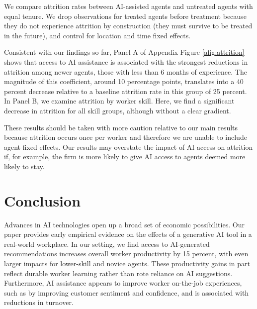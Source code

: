 \documentclass[11pt]{article}
\begin{document}
We compare attrition rates between AI-assisted agents and untreated agents with equal tenure. We drop observations for treated agents before treatment because they do not experience attrition by construction (they must survive to be treated in the future), and control for location and time fixed effects.
 
Consistent with our findings so far, Panel A of Appendix Figure \ref{afig:attrition} shows that access to AI assistance is associated with the strongest reductions in attrition among newer agents, those with less than 6 months of experience.  The magnitude of this coefficient, around 10 percentage points, translates into a 40 percent decrease relative to a baseline attrition rate in this group of 25 percent.  In Panel B, we examine attrition by worker skill.  Here, we find a significant decrease in attrition for all skill groups, although without a clear gradient.

These results should be taken with more caution relative to our main results because attrition occurs once per worker and therefore we are unable to include agent fixed effects. Our results may overstate the impact of AI access on attrition if, for example, the firm is more likely to give AI access to agents deemed more likely to stay.  


\section{Conclusion}





Advances in AI technologies open up a broad set of economic possibilities.  Our paper provides early empirical evidence on the effects of a generative AI tool in a real-world workplace. In our setting, we find access to AI-generated recommendations increases overall worker productivity by 15 percent, with even larger impacts for lower-skill and novice agents. These productivity gains in part reflect durable worker learning rather than rote reliance on AI suggestions.  Furthermore, AI assistance appears to improve worker on-the-job experiences, such as by improving customer sentiment and confidence, and is associated with reductions in turnover.
\end{document}
